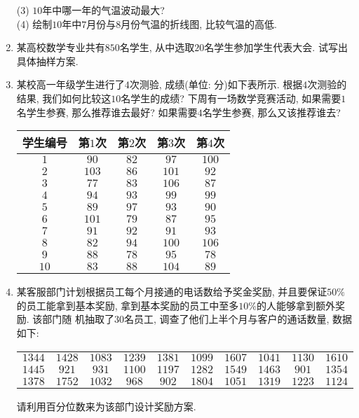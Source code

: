 \documentclass[10pt,a4paper]{article}
\begin{document}
\begin{enumerate}[1.]
(3) $10$年中哪一年的气温波动最大?\\
(4) 绘制$10$年中$7$月份与$8$月份气温的折线图, 比较气温的高低.
\item 某高校数学专业共有$850$名学生, 从中选取$20$名学生参加学生代表大会. 试写出具体抽样方案.
\item 某校高一年级学生进行了$4$次测验, 成绩(单位: 分)如下表所示. 根据$4$次测验的结果, 我们如何比较这$10$名学生的成绩? 下周有一场数学竞赛活动, 如果需要$1$名学生参赛, 那么推荐谁去最好? 如果需要$4$名学生参赛, 那么又该推荐谁去?
\begin{center}
    \begin{tabular}{|c|c|c|c|c|}
        \hline
        学生编号 & 第$1$次 & 第$2$次 & 第$3$次 & 第$4$次 \\ \hline
        $1$ & $90$ & $82$ & $97$ & $100$ \\ \hline
        $2$ & $103$ & $86$ & $101$ & $92$ \\ \hline
        $3$ & $77$ & $83$ & $106$ & $87$ \\ \hline
        $4$ & $94$ & $93$ & $99$ & $99$ \\ \hline 
        $5$ & $89$ & $97$ & $93$ & $90$\\ \hline
        $6$ & $101$ & $79$ & $87$ & $95$\\ \hline
        $7$ & $91$ & $92$ & $91$ & $93$ \\ \hline
        $8$ & $82$ & $94$ & $100$ & $106$ \\ \hline
        $9$ & $88$ & $78$ & $95$ & $78$ \\ \hline
        $10$ & $83$ & $88$ & $104$ & $89$ \\ \hline        
    \end{tabular}
\end{center}
\item 某客服部门计划根据员工每个月接通的电话数给予奖金奖励, 并且要保证$50\%$的员工能拿到基本奖励, 拿到基本奖励的员工中至多$10\%$的人能够拿到额外奖励. 该部门随
机抽取了$30$名员工, 调查了他们上半个月与客户的通话数量, 数据如下:
\begin{center}
    \begin{tabular}{cccccccccc}
        $1344$ & $1428$ & $1083$ & $1239$ & $1381$ & $1099$ & $1607$ & $1041$ & $1130$ & $1610$ \\
        $1445$ & $921$ & $931$ & $1100$ & $1197$ & $1282$ & $1549$ & $1463$ & $901$ & $1354$ \\
        $1378$ & $1752$ & $1032$ & $968$ & $902$ & $1804$ & $1051$ & $1319$ & $1223$ & $1124$
    \end{tabular}
\end{center}
请利用百分位数来为该部门设计奖励方案.
\end{enumerate}
\end{document}
